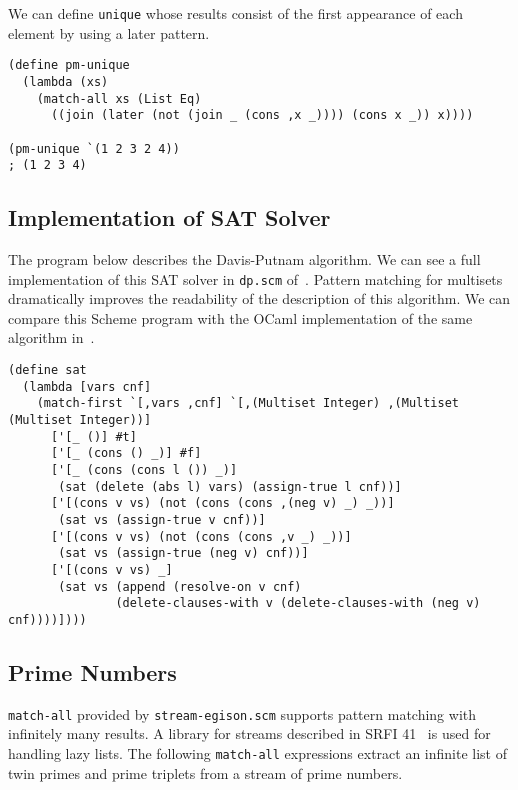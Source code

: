 \documentclass[acmlarge]{acmart}
\begin{document}
\noindent We can define \texttt{unique} whose results consist of the first appearance of each element by using a later pattern.

{\footnotesize
\begin{lstlisting}[language=egison]
(define pm-unique
  (lambda (xs)
    (match-all xs (List Eq)
      ((join (later (not (join _ (cons ,x _)))) (cons x _)) x))))

(pm-unique `(1 2 3 2 4))
; (1 2 3 4)
\end{lstlisting}
}

\subsection{Implementation of SAT Solver}

The program below describes the Davis-Putnam algorithm.
We can see a full implementation of this SAT solver in \texttt{dp.scm} of~\cite{egisonScheme}.
Pattern matching for multisets dramatically improves the readability of the description of this algorithm.
We can compare this Scheme program with the OCaml implementation of the same algorithm in~\cite{harrison2009handbook}.

\begin{lstlisting}[language=egison]
(define sat
  (lambda [vars cnf]
    (match-first `[,vars ,cnf] `[,(Multiset Integer) ,(Multiset (Multiset Integer))]
      ['[_ ()] #t]
      ['[_ (cons () _)] #f]
      ['[_ (cons (cons l ()) _)]
       (sat (delete (abs l) vars) (assign-true l cnf))]
      ['[(cons v vs) (not (cons (cons ,(neg v) _) _))]
       (sat vs (assign-true v cnf))]
      ['[(cons v vs) (not (cons (cons ,v _) _))]
       (sat vs (assign-true (neg v) cnf))]
      ['[(cons v vs) _]
       (sat vs (append (resolve-on v cnf)
               (delete-clauses-with v (delete-clauses-with (neg v) cnf))))])))
\end{lstlisting}


\subsection{Prime Numbers}

\texttt{match-all} provided by \verb|stream-egison.scm| supports pattern matching with infinitely many results.
A library for streams described in SRFI 41~\cite{bewig2007scheme} is used for handling lazy lists.
The following \texttt{match-all} expressions extract an infinite list of twin primes and prime triplets from a stream of prime numbers.
\end{document}
